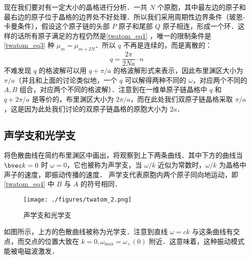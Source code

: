 现在我们要对有一定大小的晶格进行分析．一共 $N$ 个原胞，其中最左边的原子和最右边的原子位于晶格的边界处不好处理．所以我们采用周期性边界条件（玻恩-卡曼条件），假设这个原子链的头部 $P$ 原子和尾部 $Q$ 原子相连，形成一个环．这样的话所有原子满足的方程仍然是\autoref{twatom_eq1} ，唯一的限制条件是 \autoref{twatom_eq3} 种 $\mu_{m}=\mu_{m+2N}$．所以 $q$ 不再是连续的，而是离散的：
\begin{equation}
q=\frac{2\pi}{2Na} \cdot n
\end{equation}
不难发现 $q$ 的格波解可以用 $q+\pi/a$ 的格波解形式来表示，因此布里渊区大小为 $\pi/a$（并且和上面的讨论类似地，一个 $q$ 可以解得两种不同的 $\omega$，对应两个不同的 $A,B$ 组合，对应两个不同的格波解）．注意到在一维单原子链晶格中 $q$ 和 $q+2\pi/a$ 是等价的，布里渊区大小为 $2\pi/a$，而在此处我们双原子链晶格采取 $\pi/a$ ，这是因为此处我们讨论的双原子链晶格的原胞大小为 $2a$．
\subsection{声学支和光学支}
将色散曲线在简约布里渊区中画出，将观察到上下两条曲线．其中下方的曲线当 $\bvec k=0$ 时 $\omega=0$，它也被称为声学支，当 $\omega/k$ 近似为常数时，$\omega/k$ 为晶格中声子的速度，即振动传播的速度． 
声学支代表原胞内两个原子同向地运动，即\autoref{twatom_eq4} 中 $B$ 与 $A$ 的符号相同．
\begin{figure}[ht]
\centering
\texttt{[image: ./figures/twatom\_2.png]}
\caption{声学支和光学支} \label{twatom_fig2}
\end{figure}
如图所示，上方的色散曲线被称为光学支．注意到直线 $\omega=ck$ 与这条曲线有交点，而交点的位置大致在 $k=0,\omega_{\max}=\omega_+(0)$ 附近．这意味着，这种振动模式能被电磁波激发．